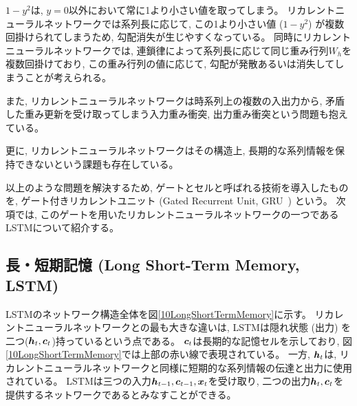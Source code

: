 $1-y^2$は, $y=0$以外において常に1より小さい値を取ってしまう。
リカレントニューラルネットワークでは系列長に応じて, この1より小さい値 ($1-y^2$) が複数回掛けられてしまうため, 勾配消失が生じやすくなっている。
同時にリカレントニューラルネットワークでは, 連鎖律によって系列長に応じて同じ重み行列$W_h$を複数回掛けており, この重み行列の値に応じて, 勾配が発散あるいは消失してしまうことが考えられる。

また, リカレントニューラルネットワークは時系列上の複数の入出力から, 矛盾した重み更新を受け取ってしまう入力重み衝突, 出力重み衝突という問題も抱えている。

更に, リカレントニューラルネットワークはその構造上, 長期的な系列情報を保持できないという課題も存在している。

以上のような問題を解決するため, ゲートとセルと呼ばれる技術を導入したものを, ゲート付きリカレントユニット (Gated Recurrent Unit, GRU~\cite{GRU}) という。
次項では, このゲートを用いたリカレントニューラルネットワークの一つであるLSTMについて紹介する。


\subsection{長・短期記憶 (Long Short-Term Memory, LSTM)} \label{DL:RNN:LongShortTermMemory}

LSTMのネットワーク構造全体を図\ref{10LongShortTermMemory}に示す。
リカレントニューラルネットワークとの最も大きな違いは, LSTMは隠れ状態 (出力) を二つ(${\mbox{\boldmath{$h$}}}_t,{\mbox{\boldmath{$c$}}}_t$)持っているという点である。
${\mbox{\boldmath{$c$}}}_t$は長期的な記憶セルを示しており, 図\ref{10LongShortTermMemory}では上部の赤い線で表現されている。
一方, ${\mbox{\boldmath{$h$}}}_t$は, リカレントニューラルネットワークと同様に短期的な系列情報の伝達と出力に使用されている。
LSTMは三つの入力${\mbox{\boldmath{$h$}}}_{t-1},{\mbox{\boldmath{$c$}}}_{t-1},{\mbox{\boldmath{$x$}}}_t$を受け取り, 二つの出力${\mbox{\boldmath{$h$}}}_t,{\mbox{\boldmath{$c$}}}_t$を提供するネットワークであるとみなすことができる。

